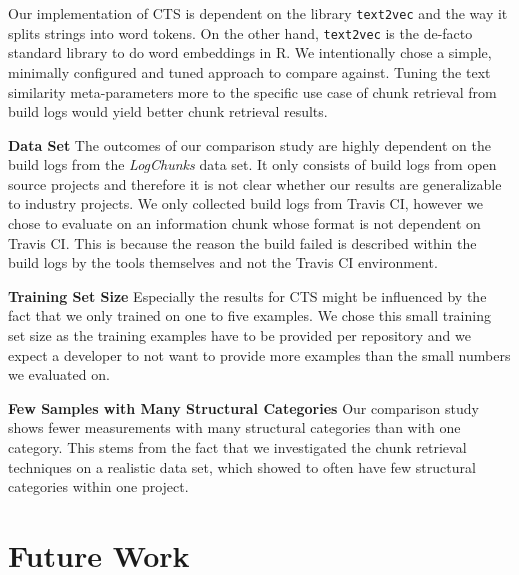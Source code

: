 Our implementation of CTS is dependent on the library {\tt text2vec}
and the way it splits strings into word tokens.
On the other hand,
{\tt text2vec} is the de-facto standard library to do word embeddings
in R.
We intentionally chose a simple, minimally configured and tuned
approach to compare against.
Tuning the text similarity
meta-parameters more to the specific use case of chunk retrieval from
build logs would yield better chunk retrieval results.

\noindent
\textbf{Data Set}
The outcomes of our comparison study are highly dependent on the build
logs from the \emph{LogChunks} data set.
It only consists of build
logs from open source projects and therefore it is not clear whether
our results are generalizable to industry projects.
We only collected
build logs from Travis CI, however we chose to evaluate on an
information chunk whose format is not dependent on Travis CI\@.
This
is because the reason the build failed is described within the build
logs by the tools themselves and not the Travis CI environment.

\noindent
\textbf{Training Set Size}
Especially the results for CTS might be influenced by the fact that we
only trained on one to five examples.
We chose this small training set
size as the training examples have to be provided per repository and
we expect a developer to not want to provide more examples than the
small numbers we evaluated on.

\noindent
\textbf{Few Samples with Many Structural Categories}
Our comparison study shows fewer measurements with many structural
categories than with one category.
This stems from the fact that we investigated the chunk retrieval
techniques on a realistic data set, which showed to often have few
structural categories within one project.

\section{Future Work}

